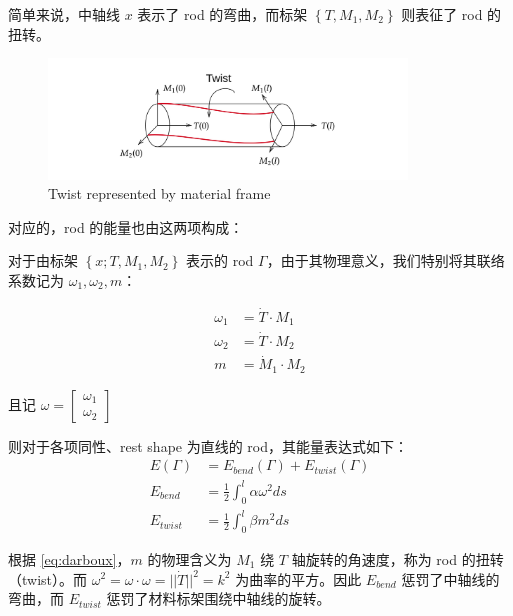 \documentclass{notes}
\begin{document}
简单来说，中轴线 $x$ 表示了 rod 的弯曲，而标架 $\left\lbrace T, M_1, M_2 \right\rbrace$ 则表征了 rod 的扭转。

\begin{figure}[H]
	\centering
	\includegraphics[width=0.85\textwidth]{img/Twist.png}
	\caption{Twist represented by material frame}
\end{figure}

对应的，rod 的能量也由这两项构成：

\begin{definition}
	对于由标架 $\left\lbrace x; T, M_1, M_2 \right\rbrace$ 表示的 rod $\Gamma$，由于其物理意义，我们特别将其联络系数记为 $\omega_1, \omega_2, m$：

	\begin{equation}
		\begin{aligned}
			\omega_1 &= \dot{T} \cdot M_1 \\
			\omega_2 &= \dot{T} \cdot M_2 \\
			m &= \dot{M}_1 \cdot M_2
		\end{aligned}
	\end{equation}
	
	且记 $\omega = \begin{bmatrix}\omega_1 \\ \omega_2\end{bmatrix}$

	则对于各项同性、rest shape 为直线的 rod，其能量表达式如下：
	\begin{equation}
		\begin{aligned}
			E(\Gamma) &= E_{bend}(\Gamma) + E_{twist}(\Gamma) \\
			E_{bend} &= \frac{1}{2} \int_{0}^{l} \alpha \omega^2 ds \\
			E_{twist} &= \frac{1}{2} \int_{0}^{l} \beta m^2 ds
		\end{aligned}
	\end{equation}
\end{definition}

\begin{remark}
	根据 \ref{eq:darboux}，$m$ 的物理含义为 $M_1$ 绕 $T$ 轴旋转的角速度，称为 rod 的扭转（twist）。而 $\omega^2 = \omega \cdot \omega = || \dot{T} ||^2 = k^2$ 为曲率的平方。因此 $E_{bend}$ 惩罚了中轴线的弯曲，而 $E_{twist}$ 惩罚了材料标架围绕中轴线的旋转。
\end{remark}
\end{document}
